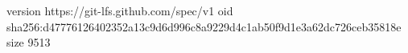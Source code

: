 version https://git-lfs.github.com/spec/v1
oid sha256:d47776126402352a13c9d6d996c8a9229d4c1ab50f9d1e3a62dc726ceb35818e
size 9513
